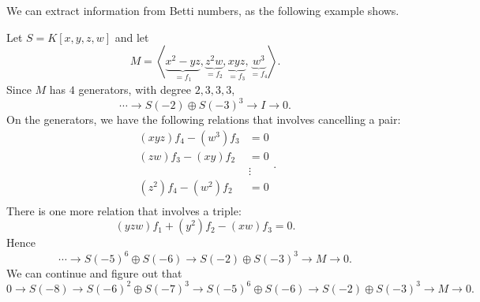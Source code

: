 \documentclass[co439]{subfiles}
\begin{document}
    \rruleline
    
    \np We can extract information from Betti numbers, as the following example shows.

    \begin{example}{}
        Let $S=K\left[ x,y,z,w \right]$ and let
        \begin{equation*}
            M = \left< \underbrace{x^{2}-yz}_{=f_1},\underbrace{z^{2}w}_{=f_2},\underbrace{xyz}_{=f_3},\underbrace{w^{3}}_{=f_4} \right> .
        \end{equation*}
        Since $M$ has $4$ generators, with degree $2,3,3,3$, 
        \begin{equation*}
            \cdots \to S\left( -2 \right)\oplus S\left( -3 \right)^3 \to I \to 0.
        \end{equation*}
        On the generators, we have the following relations that involves cancelling a pair:
        \begin{equation*}
            \begin{aligned}
                \left( xyz \right) f_4 - \left( w^{3} \right)f_3 & = 0 \\
                \left( zw \right) f_3 - \left( xy \right)f_2 & = 0 \\
                                                                  & \vdots \\
                \left( z^{2} \right)f_4 - \left( w^{2} \right)f_2 & = 0 \\
            \end{aligned} .
        \end{equation*}
        There is one more relation that involves a triple:
        \begin{equation*}
            \left( yzw \right)f_1 + \left( y^{2} \right)f_2 - \left( xw \right)f_3 = 0.
        \end{equation*}
        Hence
        \begin{equation*}
            \cdots\to S\left( -5 \right)^6\oplus S\left( -6 \right)\to S\left( -2 \right)\oplus S\left( -3 \right)^3\to M \to 0.
        \end{equation*}
        We can continue and figure out that
        \begin{equation*}
            0\to S\left( -8 \right)\to S\left( -6 \right)^{2}\oplus S\left( -7 \right)^{3}\to S\left( -5 \right)^6\oplus S\left( -6 \right)\to S\left( -2 \right)\oplus S\left( -3 \right)^3\to M \to 0.
        \end{equation*}


\end{example}
\end{document}
